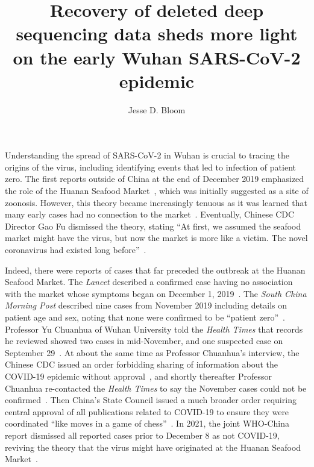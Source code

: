 \documentclass[9pt,twocolumn,twoside]{gsajnl_modified}
\title{Recovery of deleted deep sequencing data sheds more light on the early Wuhan SARS-CoV-2 epidemic}
\author[]{\Large Jesse D. Bloom}
\affil[]{Fred Hutchinson Cancer Research Center}
\affil[]{Howard Hughes Medical Institute}
\affil[]{Seattle, WA, USA}
\begin{document}
\maketitle
\thispagestyle{firststyle}
\firstpagefootnote

\vspace{-33pt}%

\lettrine[lines=2]{\color{color2}U}{}nderstanding the spread of SARS-CoV-2 in Wuhan is crucial to tracing the origins of the virus, including identifying events that led to infection of patient zero.
The first reports outside of China at the end of December 2019 emphasized the role of the Huanan Seafood Market~\citep{ProMED2109}, which was initially suggested as a site of zoonosis.
However, this theory became increasingly tenuous as it was learned that many early cases had no connection to the market~\citep{cohen2020wuhan,huang2020clinical, chen2020epidemiological}.
Eventually, Chinese CDC Director Gao Fu dismissed the theory, stating ``At first, we assumed the seafood market might have the virus, but now the market is more like a victim.
The novel coronavirus had existed long before''~\citep{GlobalTimes2020}.

Indeed, there were reports of cases that far preceded the outbreak at the Huanan Seafood Market.
The \textit{Lancet} described a confirmed case having no association with the market whose symptoms began on December 1, 2019~\citep{huang2020clinical}.
The \textit{South China Morning Post} described nine cases from November 2019 including details on patient age and sex, noting that none were confirmed to be ``patient zero''~\citep{ma2020SCMP}.
Professor Yu Chuanhua of Wuhan University told the \textit{Health Times} that records he reviewed showed two cases in mid-November, and one suspected case on September 29~\citep{healthtimes2020}.
At about the same time as Professor Chuanhua's interview, the Chinese CDC issued an order forbidding sharing of information about the COVID-19 epidemic without approval~\citep{chinacdc2020}, and shortly thereafter Professor Chuanhua re-contacted the \textit{Health Times} to say the November cases could not be confirmed~\citep{healthtimes2020}.
Then China's State Council issued a much broader order requiring central approval of all publications related to COVID-19 to ensure they were coordinated ``like moves in a game of chess''~\citep{Kang2020}.
In 2021, the joint WHO-China report dismissed all reported cases prior to December 8 as not COVID-19, reviving the theory that the virus might have originated at the Huanan Seafood Market~\citep{WHO2021origins}.
\end{document}
